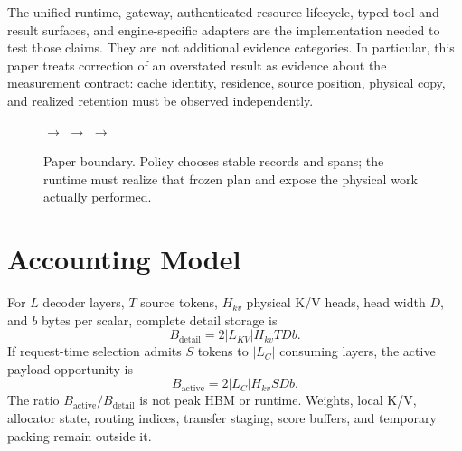 \documentclass[11pt]{article}
\begin{document}
The unified runtime, gateway, authenticated resource lifecycle, typed tool and
result surfaces, and engine-specific adapters are the implementation needed to
test those claims.  They are not additional evidence categories.  In
particular, this paper treats correction of an overstated result as evidence
about the measurement contract: cache identity, residence, source position,
physical copy, and realized retention must be observed independently.

\begin{figure}[H]
\centering
\small
{}
$\longrightarrow$
$\longrightarrow$
$\longrightarrow$
\caption{Paper boundary.  Policy chooses stable records and spans; the runtime
must realize that frozen plan and expose the physical work actually performed.}
\label{fig:runtime-boundary}
\end{figure}

\section{Accounting Model}

For $L$ decoder layers, $T$ source tokens, $H_{kv}$ physical K/V heads, head
width $D$, and $b$ bytes per scalar, complete detail storage is
\[
B_{\mathrm{detail}}=2|L_{KV}|H_{kv}TDb.
\]
If request-time selection admits $S$ tokens to $|L_C|$ consuming layers, the
active payload opportunity is
\[
B_{\mathrm{active}}=2|L_C|H_{kv}SDb.
\]
The ratio $B_{\mathrm{active}}/B_{\mathrm{detail}}$ is not peak HBM or runtime.
Weights, local K/V, allocator state, routing indices, transfer staging, score
buffers, and temporary packing remain outside it.
\end{document}
